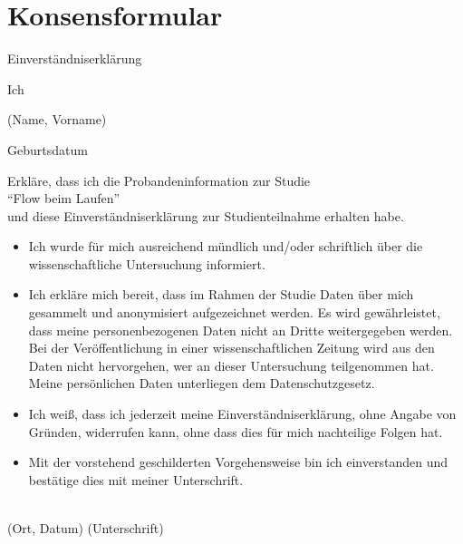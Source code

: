 \section{Konsensformular}

{\Huge Einverständniserklärung}\\
\begin{singlespace}
Ich \hrulefill									
\begin{center}				
	(Name, Vorname) 
\end{center}
Geburtsdatum \hrulefill							

\begin{center}	
Erkläre, dass ich die Probandeninformation zur Studie\\ 
"`Flow beim Laufen"'\\
und diese Einverständniserklärung zur Studienteilnahme erhalten habe. 
\end{center}

\begin{itemize}
	\item Ich wurde für mich ausreichend mündlich und/oder schriftlich über die wissenschaftliche Untersuchung informiert. 
	\item Ich erkläre mich bereit, dass im Rahmen der Studie Daten über mich gesammelt und anonymisiert aufgezeichnet werden. Es wird gewährleistet, dass meine personenbezogenen Daten nicht an Dritte weitergegeben werden. Bei der Veröffentlichung in einer wissenschaftlichen Zeitung wird aus den Daten nicht hervorgehen, wer an dieser Untersuchung teilgenommen hat. Meine persönlichen Daten unterliegen dem Datenschutzgesetz. 
	\item Ich weiß, dass ich jederzeit meine Einverständniserklärung, ohne Angabe von Gründen, widerrufen kann, ohne dass dies für mich nachteilige Folgen hat. 
	\item Mit der vorstehend geschilderten Vorgehensweise bin ich einverstanden und bestätige dies mit meiner Unterschrift. 
\end{itemize}
\vspace{15mm}
\hrulefill \\						
(Ort, Datum) \hspace{20mm} (Unterschrift) 
\end{singlespace}
